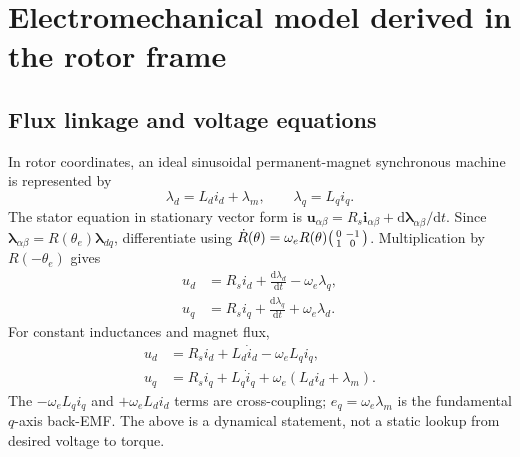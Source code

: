 \documentclass[10pt,letterpaper]{article}
\newcommand{\dd}{\mathrm{d}}
\begin{document}
\section{Electromechanical model derived in the rotor frame}
\subsection{Flux linkage and voltage equations}
In rotor coordinates, an ideal sinusoidal permanent-magnet synchronous machine is represented by
\begin{equation}\label{eq:flux}
\lambda_d=L_di_d+\lambda_m,\qquad \lambda_q=L_q i_q.
\end{equation}
The stator equation in stationary vector form is $\bm{u}_{\alpha\beta}=R_s\bm i_{\alpha\beta}+\dd\bm\lambda_{\alpha\beta}/\dd t$. Since $\bm\lambda_{\alpha\beta}=R(\theta_e)\bm\lambda_{dq}$, differentiate using $\dot R(\theta)=\omega_e R(\theta)\begin{psmallmatrix}0&-1\\1&0\end{psmallmatrix}$. Multiplication by $R(-\theta_e)$ gives
\begin{align}
 u_d&=R_si_d+\frac{\dd\lambda_d}{\dd t}-\omega_e\lambda_q,\\
 u_q&=R_si_q+\frac{\dd\lambda_q}{\dd t}+\omega_e\lambda_d.
\end{align}
For constant inductances and magnet flux,
\begin{align}\label{eq:dqmodel}
 u_d&=R_si_d+L_d\dot i_d-\omega_e L_qi_q,\\
 u_q&=R_si_q+L_q\dot i_q+\omega_e(L_di_d+\lambda_m).
\end{align}
The $-\omega_eL_qi_q$ and $+\omega_eL_di_d$ terms are cross-coupling; $e_q=\omega_e\lambda_m$ is the fundamental $q$-axis back-EMF. The above is a dynamical statement, not a static lookup from desired voltage to torque.
\end{document}
